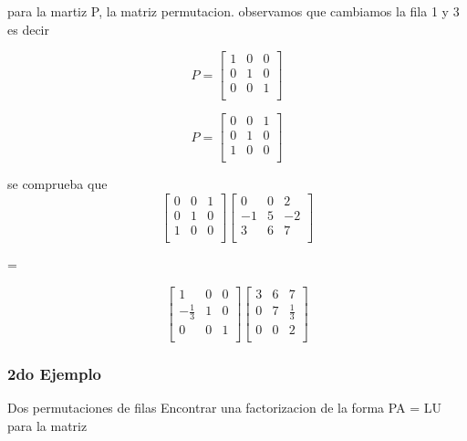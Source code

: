 \documentclass{article}
\begin{document}
para la martiz P, la matriz permutacion. observamos que cambiamos la fila 
1 y 3 es decir

\[
    P=
    \begin{bmatrix}
        1 & 0  & 0   \\
        0 & 1  & 0   \\
        0 & 0  & 1   \\
    \end{bmatrix}
\]


\[
    P=
    \begin{bmatrix}
        0 & 0  & 1   \\
        0 & 1  & 0   \\
        1 & 0  & 0   \\
    \end{bmatrix}
\]

se comprueba que 
\[
    \begin{bmatrix}
        0 & 0  & 1   \\
        0 & 1  & 0   \\
        1 & 0  & 0   \\
    \end{bmatrix}
    \begin{bmatrix}
        0 & 0  & 2   \\
        -1 & 5  & -2   \\
        3 & 6  & 7   \\
    \end{bmatrix}
\]

=

\[
    \begin{bmatrix}
        1 & 0  & 0   \\
       -\frac{1}{3}  & 1  & 0   \\
        0 & 0  & 1   \\
    \end{bmatrix}
    \begin{bmatrix}
        3 & 6 & 7   \\
        0 & 7  & \frac{1}{3}   \\
        0 & 0  & 2   \\
    \end{bmatrix}
\]

\subsubsection{2do Ejemplo}

Dos permutaciones de filas 
Encontrar una factorizacion de la forma PA = LU para la matriz
\end{document}
